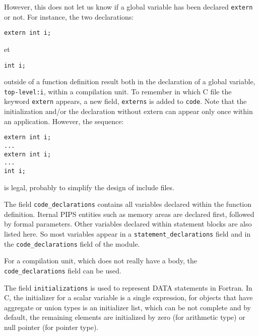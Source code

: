 \documentclass[a4paper]{report}
\begin{document}
However, this does not let us know if a global variable has been
declared \verb/extern/ or not. For instance, the two declarations:
\begin{verbatim}
extern int i;
\end{verbatim}
et
\begin{verbatim}
int i;
\end{verbatim}
outside of a function definition result both in the declaration of a
global variable, \lstinline/top-level:i/, within a compilation unit.
To remember in which C file the keyword \verb/extern/ appears, a new
field, \verb/externs/ is added to \verb/code/. Note that the
initialization and/or the declaration without extern can appear only
once within an application. However, the sequence:
\begin{verbatim}
extern int i;
...
extern int i;
...
int i;
\end{verbatim}
is legal, probably to simplify the design of include files.

The field \verb/code_declarations/ contains all variables declared
within the function definition. Iternal PIPS entities such as memory
areas are declared first, followed by formal parameters. Other
variables declared within statement blocks are also listed here. So
most variables appear in a \verb/statement_declarations/ field and in
the \verb/code_declarations/ field of the module.

For a compilation unit, which does not really have a body, the
\verb/code_declarations/ field can be used.

The field \verb/initializations/ is used to represent DATA statements
in Fortran. In C, the initializer for a scalar variable is a single
expression, for objects that have aggregate or union types is an
initializer list, which can be not complete and by default, the
remaining elements are initialized by zero (for arithmetic type) or
null pointer (for pointer type).
\end{document}
